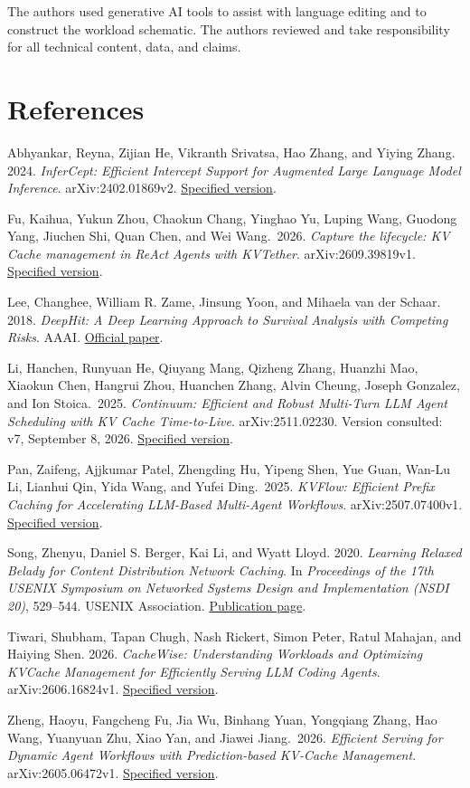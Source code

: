 \documentclass[sigconf, screen, review]{acmart}
\begin{document}
\begin{acks}
The authors used generative AI tools to assist with language editing and to construct the workload schematic. The authors reviewed and take responsibility for all technical content, data, and claims.
\end{acks}

\section*{References}\label{references}
\small

Abhyankar, Reyna, Zijian He, Vikranth Srivatsa, Hao Zhang, and Yiying
Zhang. 2024. \emph{InferCept: Efficient Intercept Support for Augmented
Large Language Model Inference}. arXiv:2402.01869v2.
\href{https://arxiv.org/abs/2402.01869v2}{Specified version}.

Fu, Kaihua, Yukun Zhou, Chaokun Chang, Yinghao Yu, Luping Wang, Guodong Yang, Jiuchen Shi, Quan Chen, and Wei Wang.~2026. \emph{Capture the lifecycle: KV Cache
management in ReAct Agents with KVTether}. arXiv:2609.39819v1.
\href{https://arxiv.org/abs/2609.39819v1}{Specified version}.

Lee, Changhee, William R. Zame, Jinsung Yoon, and Mihaela van der
Schaar. 2018. \emph{DeepHit: A Deep Learning Approach to Survival
Analysis with Competing Risks}. AAAI.
\href{https://cdn.aaai.org/ojs/11842/11842-13-15370-1-2-20201228.pdf}{Official
paper}.

Li, Hanchen, Runyuan He, Qiuyang Mang, Qizheng Zhang, Huanzhi Mao, Xiaokun Chen, Hangrui Zhou, Huanchen Zhang, Alvin Cheung, Joseph Gonzalez, and Ion Stoica.~2025. \emph{Continuum: Efficient and Robust
Multi-Turn LLM Agent Scheduling with KV Cache Time-to-Live}.
arXiv:2511.02230. Version consulted: v7, September 8, 2026.
\href{https://arxiv.org/abs/2511.02230v7}{Specified version}.

Pan, Zaifeng, Ajjkumar Patel, Zhengding Hu, Yipeng Shen, Yue Guan, Wan-Lu Li, Lianhui Qin, Yida Wang, and Yufei Ding.~2025. \emph{KVFlow: Efficient Prefix Caching for
Accelerating LLM-Based Multi-Agent Workflows}. arXiv:2507.07400v1.
\href{https://arxiv.org/abs/2507.07400v1}{Specified version}.

Song, Zhenyu, Daniel S. Berger, Kai Li, and Wyatt Lloyd. 2020. \emph{Learning Relaxed Belady for
Content Distribution Network Caching}. In \emph{Proceedings of the 17th USENIX Symposium on Networked Systems Design and Implementation (NSDI 20)}, 529--544. USENIX Association.
\href{https://www.usenix.org/conference/nsdi20/presentation/song}{Publication page}.

Tiwari, Shubham, Tapan Chugh, Nash Rickert, Simon Peter, Ratul Mahajan,
and Haiying Shen. 2026. \emph{CacheWise: Understanding Workloads and
Optimizing KVCache Management for Efficiently Serving LLM Coding
Agents}. arXiv:2606.16824v1.
\href{https://arxiv.org/abs/2606.16824v1}{Specified version}.

Zheng, Haoyu, Fangcheng Fu, Jia Wu, Binhang Yuan, Yongqiang Zhang, Hao Wang, Yuanyuan Zhu, Xiao Yan, and Jiawei Jiang.~2026. \emph{Efficient Serving for Dynamic Agent
Workflows with Prediction-based KV-Cache Management}.
arXiv:2605.06472v1. \href{https://arxiv.org/abs/2605.06472v1}{Specified
version}.
\end{document}

